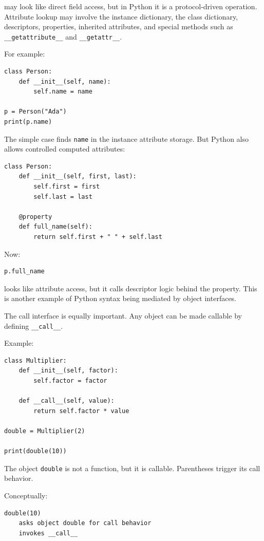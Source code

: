 may look like direct field access, but in Python it is a protocol-driven operation. Attribute lookup may involve the instance dictionary, the class dictionary, descriptors, properties, inherited attributes, and special methods such as \texttt{\_\_getattribute\_\_} and \texttt{\_\_getattr\_\_}.

For example:

\begin{verbatim}
class Person:
    def __init__(self, name):
        self.name = name

p = Person("Ada")
print(p.name)
\end{verbatim}

The simple case finds \texttt{name} in the instance attribute storage. But Python also allows controlled computed attributes:

\begin{verbatim}
class Person:
    def __init__(self, first, last):
        self.first = first
        self.last = last

    @property
    def full_name(self):
        return self.first + " " + self.last
\end{verbatim}

Now:

\begin{verbatim}
p.full_name
\end{verbatim}

looks like attribute access, but it calls descriptor logic behind the property. This is another example of Python syntax being mediated by object interfaces.

The call interface is equally important. Any object can be made callable by defining \texttt{\_\_call\_\_}.

Example:

\begin{verbatim}
class Multiplier:
    def __init__(self, factor):
        self.factor = factor

    def __call__(self, value):
        return self.factor * value

double = Multiplier(2)

print(double(10))
\end{verbatim}

The object \texttt{double} is not a function, but it is callable. Parentheses trigger its call behavior.

Conceptually:

\begin{verbatim}
double(10)
    asks object double for call behavior
    invokes __call__
\end{verbatim}

